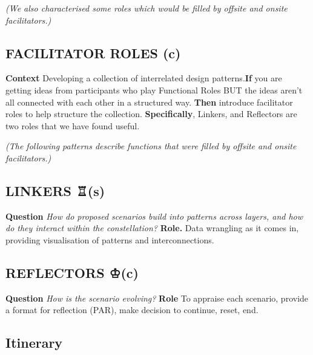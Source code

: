 \documentclass[acmlarge,timestamp]{acmart}
\newcommand{\sensory}{(s)}
\newcommand{\cognitive}{(c)}
\begin{document}
\smallskip

\noindent \emph{(We also characterised some roles which would be
filled by offsite and onsite facilitators.)}

\subsection*{FACILITATOR ROLES {\hfill \cognitive}}
\textbf{Context} Developing a collection of interrelated design
patterns.\newline \textbf{If} you are getting ideas from participants
who play {\sc Functional Roles} BUT the ideas aren’t all connected
with each other in a structured way.\newline
\textbf{Then} introduce
facilitator roles to help structure the collection.\newline
\textbf{Specifically}, {\sc Linkers}, and {\sc Reflectors} are two
roles that we have found useful.

\emph{(The following patterns describe functions that were filled by
offsite and onsite facilitators.)}

\subsection*{LINKERS {\chess ♖}{\hfill \sensory}}

\textbf{Question}
\emph{How do proposed scenarios build into patterns across layers, and how do they interact within the constellation?}\newline
\textbf{Role.} Data wrangling as it comes in, providing visualisation of patterns and interconnections.

\subsection*{REFLECTORS {\chess ♔}{\hfill \cognitive}}

\textbf{Question} \emph{How is the scenario evolving?}\newline
\textbf{Role} To appraise each scenario, provide a format for reflection (PAR), make decision to continue, reset, end.

\subsection{Itinerary}
\end{document}
